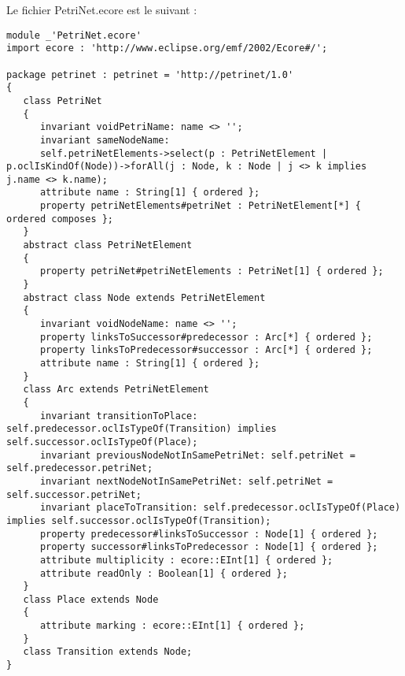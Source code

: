\vspace{2em}
Le fichier PetriNet.ecore est le suivant :
\begin{lstlisting}[caption=PetriNet.ecore]
module _'PetriNet.ecore'
import ecore : 'http://www.eclipse.org/emf/2002/Ecore#/';

package petrinet : petrinet = 'http://petrinet/1.0'
{
   class PetriNet
   {
      invariant voidPetriName: name <> '';
      invariant sameNodeName:
      self.petriNetElements->select(p : PetriNetElement | p.oclIsKindOf(Node))->forAll(j : Node, k : Node | j <> k implies j.name <> k.name);
      attribute name : String[1] { ordered };
      property petriNetElements#petriNet : PetriNetElement[*] { ordered composes };
   }
   abstract class PetriNetElement
   {
      property petriNet#petriNetElements : PetriNet[1] { ordered };
   }
   abstract class Node extends PetriNetElement
   {
      invariant voidNodeName: name <> '';
      property linksToSuccessor#predecessor : Arc[*] { ordered };
      property linksToPredecessor#successor : Arc[*] { ordered };
      attribute name : String[1] { ordered };
   }
   class Arc extends PetriNetElement
   {
      invariant transitionToPlace: self.predecessor.oclIsTypeOf(Transition) implies self.successor.oclIsTypeOf(Place);
      invariant previousNodeNotInSamePetriNet: self.petriNet = self.predecessor.petriNet;
      invariant nextNodeNotInSamePetriNet: self.petriNet = self.successor.petriNet;
      invariant placeToTransition: self.predecessor.oclIsTypeOf(Place) implies self.successor.oclIsTypeOf(Transition);
      property predecessor#linksToSuccessor : Node[1] { ordered };
      property successor#linksToPredecessor : Node[1] { ordered };
      attribute multiplicity : ecore::EInt[1] { ordered };
      attribute readOnly : Boolean[1] { ordered };
   }
   class Place extends Node
   {
      attribute marking : ecore::EInt[1] { ordered };
   }
   class Transition extends Node;
}
\end{lstlisting}
